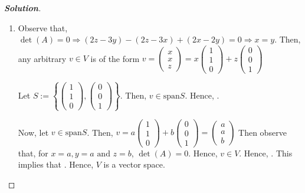 \documentclass[10pt]{scrartcl}
\theoremstyle{definition}
\newenvironment{solution} {\begin{proof}[\normalfont \textbf{Solution}]} {\end{proof}}
\begin{document}
\begin{solution}
    $ $
    \begin{enumerate}[label={(\roman*)}]
        \item Observe that, $\det(A) = 0 \Rightarrow (2z - 3y) - (2z - 3x) + (2x - 2y) = 0 \Rightarrow x = y$.
            Then, any arbitrary $v \in V$ is of the form 
            $v = 
            \begin{pmatrix}
                x \\ 
                x \\ 
                z
            \end{pmatrix}
            =x
            \begin{pmatrix}
                1 \\ 
                1 \\ 
                0
            \end{pmatrix}
            +z
            \begin{pmatrix}
                0 \\ 
                0 \\ 
                1
            \end{pmatrix}
            $

            Let 
            $S :=\left\{ 
            \begin{pmatrix}
                1 \\ 
                1 \\ 
                0
            \end{pmatrix}
            ,
            \begin{pmatrix}
                0 \\ 
                0 \\ 
                1
            \end{pmatrix}
            \right\}
            $.
            Then, $v \in \text{span}S$. Hence, .

            Now, let $v \in \text{span}S$. Then, $v = a
            \begin{pmatrix}
                1 \\ 
                1 \\ 
                0
            \end{pmatrix}
            +b
            \begin{pmatrix}
                0 \\ 
                0 \\ 
                1
            \end{pmatrix}
            =
            \begin{pmatrix}
                a \\ 
                a \\ 
                b
            \end{pmatrix}$
            Then observe that, for $x = a, y = a \text{ and }z = b$, $\det(A) = 0$.
            Hence, $v \in V$. Hence, . This implies that . Hence, $V$ is a vector space.


\end{enumerate}
\end{solution}
\end{document}
